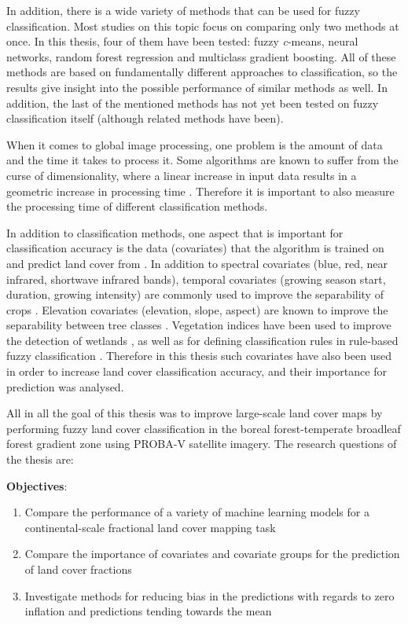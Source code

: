 \documentclass[a4paper,10pt]{article}
\begin{document}
In addition, there is a wide variety of methods that can be used for fuzzy classification. Most studies on this topic focus on comparing only two methods at once. In this thesis, four of them have been tested: fuzzy \textit{c}-means, neural networks, random forest regression and multiclass gradient boosting. All of these methods are based on fundamentally different approaches to classification, so the results give insight into the possible performance of similar methods as well. In addition, the last of the mentioned methods has not yet been tested on fuzzy classification itself (although related methods have been).

When it comes to global image processing, one problem is the amount of data and the time it takes to process it. Some algorithms are known to suffer from the curse of dimensionality, where a linear increase in input data results in a geometric increase in processing time \citep{walton2008subpixelrf}. Therefore it is important to also measure the processing time of different classification methods.

In addition to classification methods, one aspect that is important for classification accuracy is the data (covariates) that the algorithm is trained on and predict land cover from \citep{yu2014metadiscoveries}. In addition to spectral covariates (blue, red, near infrared, shortwave infrared bands), temporal covariates (growing season start, duration, growing intensity) are commonly used to improve the separability of crops \citep{jakubauskas2001harmonic}. Elevation covariates (elevation, slope, aspect) are known to improve the separability between tree classes \citep{burrough2001fuzzy}. Vegetation indices have been used to improve the detection of wetlands \citep{sader1995wetlands}, as well as for defining classification rules in rule-based fuzzy classification \citep{baraldi2006rulebased}. Therefore in this thesis such covariates have also been used in order to increase land cover classification accuracy, and their importance for prediction was analysed.

All in all the goal of this thesis was to improve large-scale land cover maps by performing fuzzy land cover classification in the boreal forest-temperate broadleaf forest gradient zone using PROBA-V satellite imagery. The research questions of the thesis are:

\textbf{Objectives}:

\begin{enumerate}
 \item Compare the performance of a variety of machine learning models for a continental-scale fractional land cover mapping task
 \item Compare the importance of covariates and covariate groups for the prediction of land cover fractions
 \item Investigate methods for reducing bias in the predictions with regards to zero inflation and predictions tending towards the mean
\end{enumerate}
\end{document}
